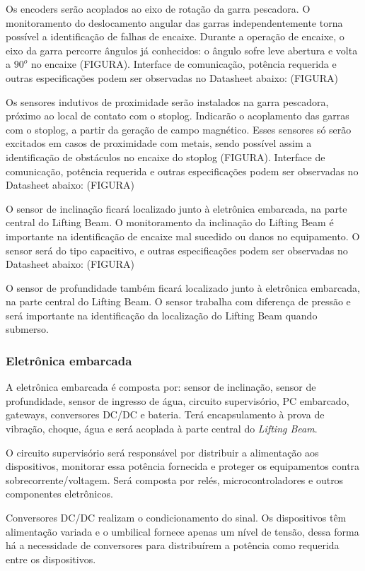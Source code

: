 Os encoders serão acoplados ao eixo de rotação da garra pescadora. O
monitoramento do deslocamento angular das garras independentemente torna
possível a identificação de falhas de encaixe. Durante a operação de encaixe, o
eixo da garra percorre ângulos já conhecidos: o ângulo sofre leve abertura e
volta a $90^o$ no encaixe (FIGURA). Interface de comunicação, potência requerida
e outras especificações podem ser observadas no Datasheet abaixo: (FIGURA)

Os sensores indutivos de proximidade serão instalados na garra pescadora,
próximo ao local de contato com o stoplog. Indicarão o acoplamento das garras
com o stoplog, a partir da geração de campo magnético. Esses sensores só serão
excitados em casos de proximidade com metais, sendo possível assim a
identificação de obstáculos no encaixe do stoplog (FIGURA). Interface de
comunicação, potência requerida e outras especificações podem ser observadas no
Datasheet abaixo: (FIGURA)

O sensor de inclinação ficará localizado junto à eletrônica embarcada, na parte
central do Lifting Beam. O monitoramento da inclinação do Lifting Beam é
importante na identificação de encaixe mal sucedido ou danos no equipamento. O
sensor será do tipo capacitivo, e outras especificações podem ser observadas no
Datasheet abaixo: (FIGURA)

O sensor de profundidade também ficará localizado junto à eletrônica embarcada,
na parte central do Lifting Beam. O sensor trabalha com diferença de pressão e
será importante na identificação da localização do Lifting Beam quando submerso.

\subsubsection{Eletrônica embarcada}
A eletrônica embarcada é composta por: sensor de inclinação, sensor de
profundidade, sensor de ingresso de água, circuito supervisório, PC embarcado,
gateways, conversores DC/DC e bateria. Terá encapsulamento à prova de vibração,
choque, água e será acoplada à parte central do \emph{Lifting Beam}.

O circuito supervisório será responsável por distribuir a alimentação aos
dispositivos, monitorar essa potência fornecida e proteger os equipamentos
contra sobrecorrente/voltagem. Será composta por relés, microcontroladores e
outros componentes eletrônicos.

Conversores DC/DC realizam o condicionamento do sinal. Os dispositivos têm
alimentação variada e o umbilical fornece apenas um nível de tensão, dessa forma
há a necessidade de conversores para distribuírem a potência como requerida
entre os dispositivos.

